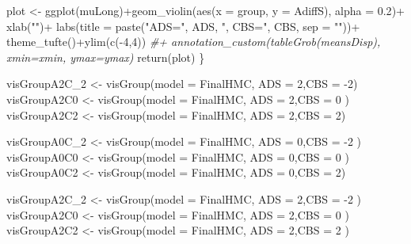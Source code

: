 \documentclass[
  10pt,
  dvipsnames,enabledeprecatedfontcommands]{scrartcl}
\newenvironment{Shaded}{\begin{snugshade}}{\end{snugshade}}
\newcommand{\AttributeTok}[1]{\textcolor[rgb]{0.77,0.63,0.00}{#1}}
\newcommand{\CommentTok}[1]{\textcolor[rgb]{0.56,0.35,0.01}{\textit{#1}}}
\newcommand{\DecValTok}[1]{\textcolor[rgb]{0.00,0.00,0.81}{#1}}
\newcommand{\FloatTok}[1]{\textcolor[rgb]{0.00,0.00,0.81}{#1}}
\newcommand{\FunctionTok}[1]{\textcolor[rgb]{0.00,0.00,0.00}{#1}}
\newcommand{\NormalTok}[1]{#1}
\newcommand{\OtherTok}[1]{\textcolor[rgb]{0.56,0.35,0.01}{#1}}
\newcommand{\SpecialCharTok}[1]{\textcolor[rgb]{0.00,0.00,0.00}{#1}}
\newcommand{\StringTok}[1]{\textcolor[rgb]{0.31,0.60,0.02}{#1}}
\begin{document}
\begin{Shaded}
\begin{Highlighting}[]
\NormalTok{plot }\OtherTok{\textless{}{-}} \FunctionTok{ggplot}\NormalTok{(muLong)}\SpecialCharTok{+}\FunctionTok{geom\_violin}\NormalTok{(}\FunctionTok{aes}\NormalTok{(}\AttributeTok{x =}\NormalTok{ group, }\AttributeTok{y =}\NormalTok{ AdiffS), }\AttributeTok{alpha =} \FloatTok{0.2}\NormalTok{)}\SpecialCharTok{+}
  \FunctionTok{xlab}\NormalTok{(}\StringTok{""}\NormalTok{)}\SpecialCharTok{+}
  \FunctionTok{labs}\NormalTok{(}\AttributeTok{title =} \FunctionTok{paste}\NormalTok{(}\StringTok{"ADS="}\NormalTok{, ADS, }\StringTok{", CBS="}\NormalTok{,  CBS,  }\AttributeTok{sep =} \StringTok{""}\NormalTok{))}\SpecialCharTok{+}
  \FunctionTok{theme\_tufte}\NormalTok{()}\SpecialCharTok{+}\FunctionTok{ylim}\NormalTok{(}\FunctionTok{c}\NormalTok{(}\SpecialCharTok{{-}}\DecValTok{4}\NormalTok{,}\DecValTok{4}\NormalTok{))}
\CommentTok{\#+   annotation\_custom(tableGrob(meansDisp), xmin=xmin,  ymax=ymax)}
\FunctionTok{return}\NormalTok{(plot)}
\NormalTok{\}}


\NormalTok{visGroupA2C\_2 }\OtherTok{\textless{}{-}} \FunctionTok{visGroup}\NormalTok{(}\AttributeTok{model =}\NormalTok{ FinalHMC, }\AttributeTok{ADS =} \DecValTok{2}\NormalTok{,}\AttributeTok{CBS =} \SpecialCharTok{{-}}\DecValTok{2}\NormalTok{)}
\NormalTok{visGroupA2C0 }\OtherTok{\textless{}{-}} \FunctionTok{visGroup}\NormalTok{(}\AttributeTok{model =}\NormalTok{ FinalHMC, }\AttributeTok{ADS =} \DecValTok{2}\NormalTok{,}\AttributeTok{CBS =} \DecValTok{0}\NormalTok{ )}
\NormalTok{visGroupA2C2 }\OtherTok{\textless{}{-}} \FunctionTok{visGroup}\NormalTok{(}\AttributeTok{model =}\NormalTok{ FinalHMC, }\AttributeTok{ADS =} \DecValTok{2}\NormalTok{,}\AttributeTok{CBS =} \DecValTok{2}\NormalTok{)}

\NormalTok{visGroupA0C\_2 }\OtherTok{\textless{}{-}} \FunctionTok{visGroup}\NormalTok{(}\AttributeTok{model =}\NormalTok{ FinalHMC, }\AttributeTok{ADS =} \DecValTok{0}\NormalTok{,}\AttributeTok{CBS =} \SpecialCharTok{{-}}\DecValTok{2}\NormalTok{ )}
\NormalTok{visGroupA0C0 }\OtherTok{\textless{}{-}} \FunctionTok{visGroup}\NormalTok{(}\AttributeTok{model =}\NormalTok{ FinalHMC, }\AttributeTok{ADS =} \DecValTok{0}\NormalTok{,}\AttributeTok{CBS =} \DecValTok{0}\NormalTok{ )}
\NormalTok{visGroupA0C2 }\OtherTok{\textless{}{-}}  \FunctionTok{visGroup}\NormalTok{(}\AttributeTok{model =}\NormalTok{ FinalHMC, }\AttributeTok{ADS =} \DecValTok{0}\NormalTok{,}\AttributeTok{CBS =} \DecValTok{2}\NormalTok{)}

\NormalTok{visGroupA2C\_2 }\OtherTok{\textless{}{-}}  \FunctionTok{visGroup}\NormalTok{(}\AttributeTok{model =}\NormalTok{ FinalHMC, }\AttributeTok{ADS =} \DecValTok{2}\NormalTok{,}\AttributeTok{CBS =} \SpecialCharTok{{-}}\DecValTok{2}\NormalTok{ )}
\NormalTok{visGroupA2C0 }\OtherTok{\textless{}{-}} \FunctionTok{visGroup}\NormalTok{(}\AttributeTok{model =}\NormalTok{ FinalHMC, }\AttributeTok{ADS =} \DecValTok{2}\NormalTok{,}\AttributeTok{CBS =} \DecValTok{0}\NormalTok{ )}
\NormalTok{visGroupA2C2 }\OtherTok{\textless{}{-}} \FunctionTok{visGroup}\NormalTok{(}\AttributeTok{model =}\NormalTok{ FinalHMC, }\AttributeTok{ADS =} \DecValTok{2}\NormalTok{,}\AttributeTok{CBS =} \DecValTok{2}\NormalTok{ )}


\end{Highlighting}
\end{Shaded}
\end{document}
